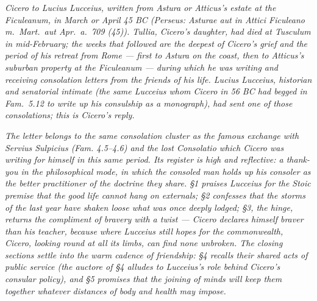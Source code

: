 
\textit{Cicero to Lucius Lucceius, written from Astura or
Atticus's estate at the Ficuleanum, in March or April 45 BC
(Perseus: \textit{Asturae aut in Attici Ficuleano m.~Mart.~aut
Apr.~a.~709 (45)}). Tullia, Cicero's daughter, had died at
Tusculum in mid-February; the weeks that followed are the
deepest of Cicero's grief and the period of his retreat from
Rome --- first to Astura on the coast, then to Atticus's
suburban property at the Ficuleanum --- during which he was
writing and receiving consolation letters from the friends of
his life. Lucius Lucceius, historian and senatorial intimate
(the same Lucceius whom Cicero in 56 BC had begged in
\textit{Fam.}~5.12 to write up his consulship as a monograph),
had sent one of those consolations; this is Cicero's reply.}

\textit{The letter belongs to the same consolation cluster as
the famous exchange with Servius Sulpicius (\textit{Fam.}
4.5--4.6) and the lost \textit{Consolatio} which Cicero was
writing for himself in this same period. Its register is high
and reflective: a thank-you in the philosophical mode, in
which the consoled man holds up his consoler as the better
practitioner of the doctrine they share. \S 1 praises Lucceius
for the Stoic premise that the good life cannot hang on
externals; \S 2 confesses that the storms of the last year
have shaken loose what was once deeply lodged; \S 3, the
hinge, returns the compliment of bravery with a twist --- Cicero
declares himself braver than his teacher, because where
Lucceius still hopes for the commonwealth, Cicero, looking
round at all its limbs, can find none unbroken. The closing
sections settle into the warm cadence of friendship: \S 4
recalls their shared acts of public service (the
\textit{auctore} of \S 4 alludes to Lucceius's role behind
Cicero's consular policy), and \S 5 promises that the joining
of minds will keep them together whatever distances of body and
health may impose.}
